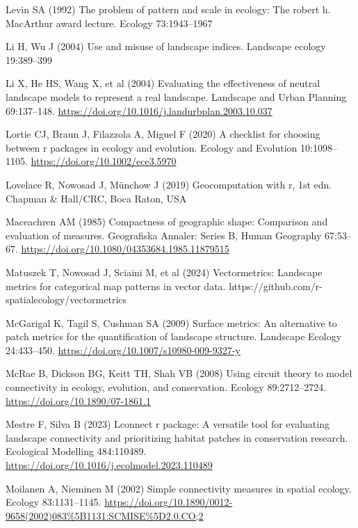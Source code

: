 \documentclass[
  10pt,
  a4paperpaper,
]{article}
\newlength{\cslhangindent}
\newenvironment{CSLReferences}[2] %
 {\begin{list}{}{%
  \setlength{\itemindent}{0pt}
  \setlength{\leftmargin}{0pt}
  \setlength{\parsep}{0pt}
  \ifodd #1
   \setlength{\leftmargin}{\cslhangindent}
   \setlength{\itemindent}{-1\cslhangindent}
  \fi
  \setlength{\itemsep}{#2\baselineskip}}}
 {\end{list}}
\begin{document}
\begin{CSLReferences}{1}{1}
Levin SA (1992) The problem of pattern and scale in ecology: The robert
h. MacArthur award lecture. Ecology 73:1943--1967

Li H, Wu J (2004) Use and misuse of landscape indices. Landscape ecology
19:389--399

Li X, He HS, Wang X, et al (2004) Evaluating the effectiveness of
neutral landscape models to represent a real landscape. Landscape and
Urban Planning 69:137--148.
\url{https://doi.org/10.1016/j.landurbplan.2003.10.037}

Lortie CJ, Braun J, Filazzola A, Miguel F (2020) A checklist for
choosing between r packages in ecology and evolution. Ecology and
Evolution 10:1098--1105. \url{https://doi.org/10.1002/ece3.5970}

Lovelace R, Nowosad J, Münchow J (2019) Geocomputation with r, 1st edn.
Chapman \& Hall/CRC, Boca Raton, USA

Maceachren AM (1985) Compactness of geographic shape: Comparison and
evaluation of measures. Geografiska Annaler: Series B, Human Geography
67:53--67. \url{https://doi.org/10.1080/04353684.1985.11879515}

Matuszek T, Nowosad J, Sciaini M, et al (2024) Vectormetrics: Landscape
metrics for categorical map patterns in vector data.
{https://github.com/r-spatialecology/vectormetrics}

McGarigal K, Tagil S, Cushman SA (2009) Surface metrics: An alternative
to patch metrics for the quantification of landscape structure.
Landscape Ecology 24:433--450.
\url{https://doi.org/10.1007/s10980-009-9327-y}

McRae B, Dickson BG, Keitt TH, Shah VB (2008) Using circuit theory to
model connectivity in ecology, evolution, and conservation. Ecology
89:2712--2724. \url{https://doi.org/10.1890/07-1861.1}

Mestre F, Silva B (2023) Lconnect r package: A versatile tool for
evaluating landscape connectivity and prioritizing habitat patches in
conservation research. Ecological Modelling 484:110489.
\url{https://doi.org/10.1016/j.ecolmodel.2023.110489}

Moilanen A, Nieminen M (2002) Simple connectivity measures in spatial
ecology. Ecology 83:1131--1145.
\url{https://doi.org/10.1890/0012-9658(2002)083\%5B1131:SCMISE\%5D2.0.CO;2}


\end{CSLReferences}
\end{document}
